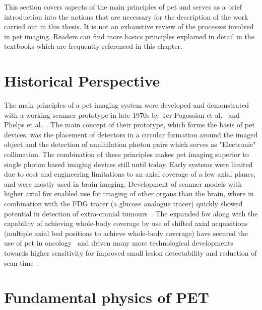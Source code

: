 This section covers aspects of the main principles of \gls{pet} and serves as a brief introduction into the notions that are necessary for the description of the work carried out in this thesis. It is not an exhaustive review of the processes involved in \gls{pet} imaging. Readers can find more basics principles explained in detail in the textbooks which are frequently referenced in this chapter.

\section{Historical Perspective}
The main principles of a \Gls{pet} imaging system were developed and demonstrated with a working scanner prototype in late 1970s by Ter-Pogossian et al.~\cite{Ter-Pogossian1975} and Phelps et al.~\cite{Phelps1975}. The main concept of their prototype, which forms the basis of \gls{pet} devices, was the placement of detectors in a circular formation around the imaged object and the detection of annihilation photon pairs which serves as "Electronic" collimation. The combination of these principles makes \gls{pet} imaging superior to single photon based imaging devices still until today. 
Early systems were limited due to cost and engineering limitations to an axial coverage of a few axial planes, and were mostly used in brain imaging. Development of scanner models with higher axial \gls{fov} enabled use for imaging of other organs than the brain, where in combination with the FDG tracer (a glucose analogue tracer) quickly showed potential in detection of extra-cranial tumours~\cite{Nutt2002}.
The expanded \gls{fov} along with the capability of achieving whole-body coverage by use of shifted axial acquisitions~\cite{Dahlbom1992} (multiple axial bed positions to achieve whole-body coverage) have secured the use of \gls{pet} in oncology~\cite{Bomanji2001} and driven many more technological developments towards higher sensitivity for  improved small lesion detectability and reduction of scan time~\cite{Jones2017}.


\section{Fundamental physics of PET}

